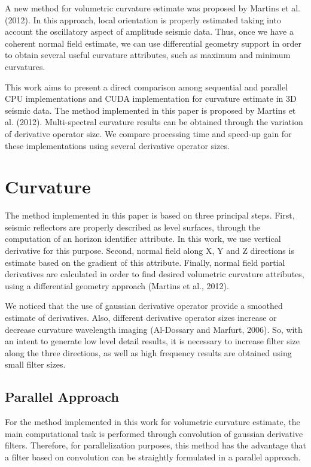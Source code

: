 \documentclass[conference]{IEEEtran}
\begin{document}
A new method for volumetric curvature estimate was proposed by Martins et al. (2012). In this approach, local orientation is properly estimated taking into account the oscillatory aspect of amplitude seismic data. Thus, once we have a coherent normal field estimate, we can use differential geometry support in order to obtain several useful curvature attributes, such as maximum and minimum curvatures.

This work aims to present a direct comparison among sequential and parallel CPU implementations and CUDA implementation for curvature estimate in 3D seismic data. The method implemented in this paper is proposed by Martins et al. (2012). Multi-spectral curvature results can be obtained through the variation of derivative operator size. We compare processing time and speed-up gain for these implementations using several derivative operator sizes.

\section{Curvature}

The method implemented in this paper is based on three principal steps. First, seismic reflectors are properly described as level surfaces, through the computation of an horizon identifier attribute. In this work, we use vertical derivative for this purpose. Second, normal field along X, Y and Z directions is estimate based on the gradient of this attribute. Finally, normal field partial derivatives are calculated in order to find desired volumetric curvature attributes, using a differential geometry approach (Martins et al., 2012).

We noticed that the use of gaussian derivative operator provide a smoothed estimate of derivatives. Also, different derivative operator sizes increase or decrease curvature wavelength imaging (Al-Dossary and Marfurt, 2006). So, with an intent to generate low level detail results, it is necessary to increase filter size along the three directions, as well as high frequency results are obtained using small filter sizes.

\subsection{Parallel Approach}
For the method implemented in this work for volumetric curvature estimate, the main computational task is performed through convolution of gaussian derivative filters. Therefore, for parallelization purposes, this method has the advantage that a filter based on convolution can be straightly formulated in a parallel approach.
\end{document}
